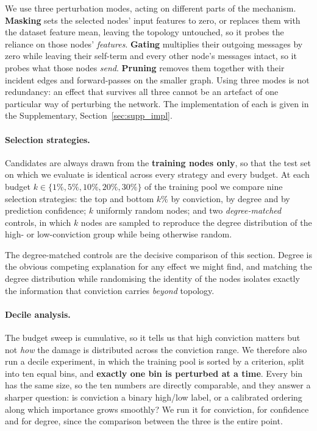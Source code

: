 We use three perturbation modes, acting on different parts of the mechanism.
\textbf{Masking} sets the selected nodes' input features to zero, or replaces
them with the dataset feature mean, leaving the topology untouched, so it probes
the reliance on those nodes' \emph{features}. \textbf{Gating} multiplies their
outgoing messages by zero while leaving their self-term and every other node's
messages intact, so it probes what those nodes \emph{send}. \textbf{Pruning}
removes them together with their incident edges and forward-passes on the
smaller graph. Using three modes is not redundancy: an effect that survives all
three cannot be an artefact of one particular way of perturbing the network. The
implementation of each is given in the Supplementary,
Section~\ref{sec:supp_impl}.

\paragraph{Selection strategies.}
Candidates are always drawn from the \textbf{training nodes only}, so that the
test set on which we evaluate is identical across every strategy and every
budget. At each budget $k \in \{1\%, 5\%, 10\%, 20\%, 30\%\}$ of the training
pool we compare nine selection strategies: the top and bottom $k\%$ by
conviction, by degree and by prediction confidence; $k$ uniformly random nodes;
and two \emph{degree-matched} controls, in which $k$ nodes are sampled to
reproduce the degree distribution of the high- or low-conviction group while
being otherwise random.

The degree-matched controls are the decisive comparison of this section. Degree
is the obvious competing explanation for any effect we might find, and matching
the degree distribution while randomising the identity of the nodes isolates
exactly the information that conviction carries \emph{beyond} topology.

\paragraph{Decile analysis.}
The budget sweep is cumulative, so it tells us that high conviction matters but
not \emph{how} the damage is distributed across the conviction range. We
therefore also run a decile experiment, in which the training pool is sorted by
a criterion, split into ten equal bins, and \textbf{exactly one bin is perturbed
at a time}. Every bin has the same size, so the ten numbers are directly
comparable, and they answer a sharper question: is conviction a binary high/low
label, or a calibrated ordering along which importance grows smoothly? We run it
for conviction, for confidence and for degree, since the comparison between the
three is the entire point.

